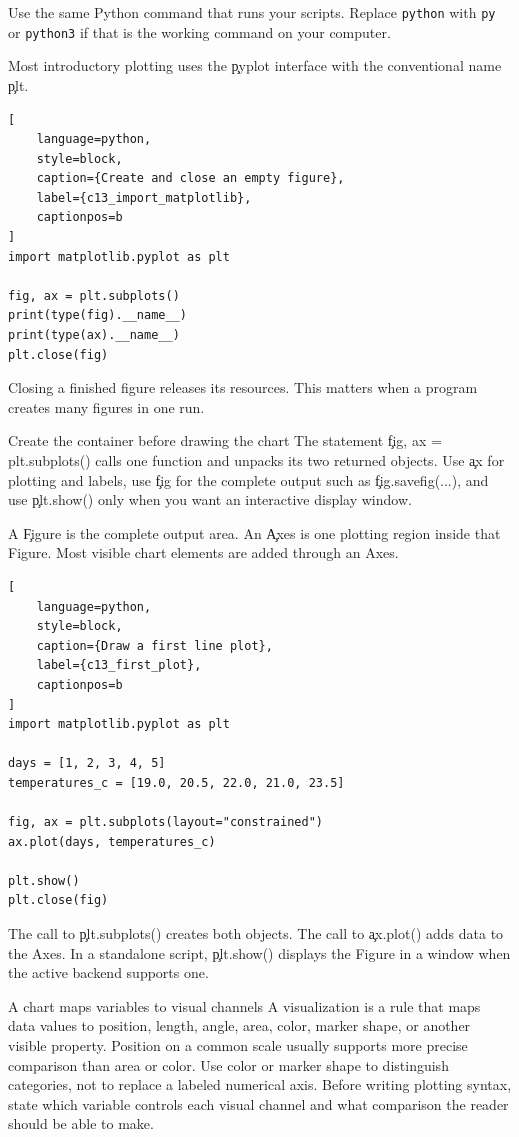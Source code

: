Use the same Python command that runs your scripts. Replace \texttt{python}
with \texttt{py} or \texttt{python3} if that is the working command on your
computer.

Most introductory plotting uses the \c{pyplot} interface with the conventional
name \c{plt}.

\begin{lstlisting}[
    language=python,
    style=block,
    caption={Create and close an empty figure},
    label={c13_import_matplotlib},
    captionpos=b
]
import matplotlib.pyplot as plt

fig, ax = plt.subplots()
print(type(fig).__name__)
print(type(ax).__name__)
plt.close(fig)
\end{lstlisting}

Closing a finished figure releases its resources. This matters when a program
creates many figures in one run.

\begin{SyntaxBox}{Create the container before drawing the chart}
The statement \c{fig, ax = plt.subplots()} calls one function and unpacks its
two returned objects. Use \c{ax} for plotting and labels, use \c{fig} for the
complete output such as \c{fig.savefig(...)}, and use \c{plt.show()} only when
you want an interactive display window.
\end{SyntaxBox}


A \c{Figure} is the complete output area. An \c{Axes} is one plotting region
inside that Figure. Most visible chart elements are added through an Axes.

\begin{lstlisting}[
    language=python,
    style=block,
    caption={Draw a first line plot},
    label={c13_first_plot},
    captionpos=b
]
import matplotlib.pyplot as plt

days = [1, 2, 3, 4, 5]
temperatures_c = [19.0, 20.5, 22.0, 21.0, 23.5]

fig, ax = plt.subplots(layout="constrained")
ax.plot(days, temperatures_c)

plt.show()
plt.close(fig)
\end{lstlisting}

The call to \c{plt.subplots()} creates both objects. The call to \c{ax.plot()}
adds data to the Axes. In a standalone script, \c{plt.show()} displays the
Figure in a window when the active backend supports one.

\begin{ExplainBox}{A chart maps variables to visual channels}
A visualization is a rule that maps data values to position, length, angle,
area, color, marker shape, or another visible property. Position on a common
scale usually supports more precise comparison than area or color. Use color
or marker shape to distinguish categories, not to replace a labeled numerical
axis. Before writing plotting syntax, state which variable controls each visual
channel and what comparison the reader should be able to make.
\end{ExplainBox}

